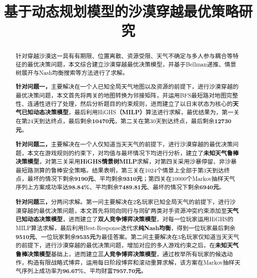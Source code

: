 \documentclass{cumcmthesis}
\title{基于动态规划模型的沙漠穿越最优策略研究}
\numberwithin{equation}{section}
\numberwithin{figure}{section}
\numberwithin{table}{section}
\begin{document}
\makeatletter 
\begin{center}
    {\huge \bfseries \@title}
\end{center}

 \begin{abstract}
     针对穿越沙漠这一具有有期限、位置离散、资源受限、天气不确定与多人参与耦合等特征的最优决策问题，本文综合建立沙漠穿越最优决策模型，并基于Bellman递推、情景树展开与Nash均衡搜索等方法进行了求解。

     \textbf{针对问题一，}主要解决在一个人已知全局天气地图以及资源的前提下，进行沙漠穿越的最优决策问题，本文首先将两关的地图转换为邻接矩阵，并运用BFS最短路对地图完整性、连通性进行了处理，然后分析题目的约束规则，进而建立了以日末状态为核心的\textbf{天气已知动态决策模型}，最后利用HiGHS\textbf{（MILP）}算法进行求解，最优结果为，第一关在第24天到达终点，最后剩余\textbf{10470元}，第二关在第30天到达终点，最后剩余\textbf{12730元}。

    \textbf{针对问题二，}主要解决在一个人仅知道当天天气的前提下，进行沙漠穿越的最优决策问题，本文在游戏规则的约束下，对均值与最坏情况下均进行分析，建立了\textbf{未知天气鲁棒决策模型}，对第三关采用\textbf{HiGHS情景树MILP}求解，对第四关采用沙暴停留、非沙暴最短路测算的鲁棒安全策略。结果表明，第三关在1024个情景上全部于第3天到达终点，最坏的情况下剩余\textbf{9190元}、平均剩余\textbf{9310元}；第四关在10000个Markov抽样天气序列上方案成功率达\textbf{98.84\%}、平均剩余\textbf{7489.81元}、最坏的情况下剩余\textbf{6940元}。

    \textbf{针对问题三，}分两问求解。第一问主要解决在2名玩家已知全局天气的前提下，进行沙漠穿越的最优决策问题，本文首先将同向同行与同矿两类对手资源冲突约束添加至\textbf{天气已知动态决策模型}，进而建立了\textbf{双人竞争博弈决策模型}，对每一位玩家运用HiGHS的MILP算法求解，最后利用Best-Response迭代求\textbf{纯Nash均衡}，得到一位玩家最后剩余\textbf{9510元}、一位玩家剩余\textbf{9535元}为最佳答案。第二问主要解决在3名玩家仅知道当天天气的前提下，进行沙漠穿越的最优决策问题，增加对应的多人游戏约束之后，在\textbf{未知天气鲁棒决策模型}基础上，进而建立\textbf{三人竞争博弈决策模型}，通过枚举所有玩家的候选动作，构造有限战略式博弈，运用每日阶段博弈和滚动重算求解，该方案在Markov抽样天气序列上成功率为\textbf{96.67\%}、平均财富\textbf{7957.70元}。

    
    \vfill
 \end{abstract}
\end{document}
